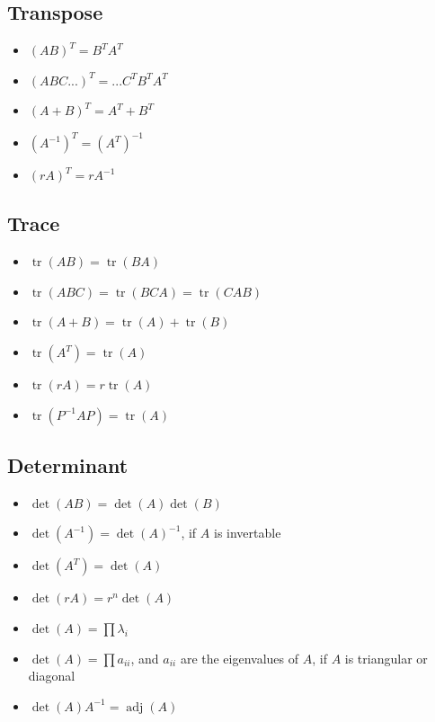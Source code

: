 \documentclass[a4paper]{article}
\theoremstyle{definition}
\theoremstyle{plain}
\begin{document}
\subsection{Transpose}
\begin{itemize}
    \item $(AB)^T=B^TA^T$
    \item $(ABC...)^T=...C^TB^TA^T$
    \item $(A+B)^T=A^T+B^T$
    \item $(A^{-1})^T=(A^T)^{-1}$
    \item $(rA)^T=rA^{-1}$
\end{itemize}

\subsection{Trace}
\begin{itemize}
    \item $\operatorname{tr}(AB)=\operatorname{tr}(BA)$
    \item $\operatorname{tr}(ABC)=\operatorname{tr}(BCA)=\operatorname{tr}(CAB)$
    \item $\operatorname{tr}(A+B)=\operatorname{tr}(A)+\operatorname{tr}(B)$
    \item $\operatorname{tr}(A^T)=\operatorname{tr}(A)$
    \item $\operatorname{tr}(rA)=r\operatorname{tr}(A)$
    \item $\operatorname{tr}(P^{-1}AP)=\operatorname{tr}(A)$
\end{itemize}

\subsection{Determinant}
\begin{itemize}
    \item $\operatorname{det}(AB)=\operatorname{det}(A)\operatorname{det}(B)$
    \item $\operatorname{det}(A^{-1})=\operatorname{det}(A)^{-1}$, if $A$ is invertable
    \item $\operatorname{det}(A^T)=\operatorname{det}(A)$
    \item $\operatorname{det}(rA)=r^n\operatorname{det}(A)$
    \item $\operatorname{det}(A)=\prod\lambda_i$
    \item $\operatorname{det}(A)=\prod a_{ii}$, and $a_{ii}$ are the eigenvalues of $A$, if $A$ is triangular or diagonal
    \item $\operatorname{det}(A)A^{-1}=\operatorname{adj}(A)$
\end{itemize}
\end{document}
